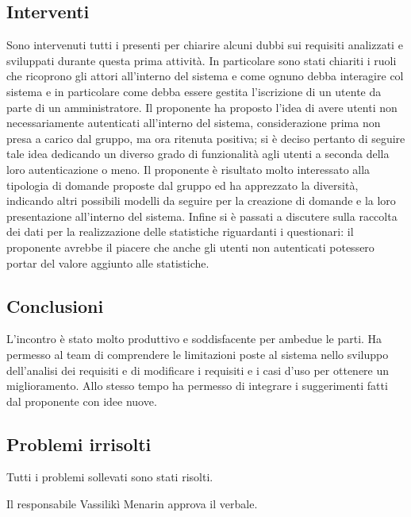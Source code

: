 \documentclass[a4paper]{article}
\def\RESPONSABILE{Vassilikì Menarin}
\begin{document}
\subsection*{Interventi}
Sono intervenuti tutti i presenti per chiarire alcuni dubbi sui requisiti analizzati e sviluppati durante questa prima attività.
\newline In particolare sono stati chiariti i ruoli che ricoprono gli attori all'interno del sistema e come ognuno debba interagire col sistema e in particolare come debba essere gestita l'iscrizione di un utente da parte di un amministratore.
\newline Il proponente ha proposto l'idea di avere utenti non necessariamente autenticati all'interno del sistema, considerazione prima non presa a carico dal gruppo, ma ora ritenuta positiva; si è deciso pertanto di seguire tale idea dedicando un diverso grado di funzionalità agli utenti a seconda della loro autenticazione o meno.
\newline Il proponente è risultato molto interessato alla tipologia di domande proposte dal gruppo ed ha apprezzato la diversità, indicando altri possibili modelli da seguire per la creazione di domande e la loro presentazione all'interno del sistema.
\newline Infine si è passati a discutere sulla raccolta dei dati per la realizzazione delle statistiche riguardanti i questionari: il proponente avrebbe il piacere che anche gli utenti non autenticati potessero portar del valore aggiunto alle statistiche.

\subsection*{Conclusioni}
L'incontro è stato molto produttivo e soddisfacente per ambedue le parti. Ha permesso al team di comprendere le limitazioni poste al sistema nello sviluppo dell'analisi dei requisiti e di modificare i requisiti e i casi d'uso per ottenere un miglioramento. Allo stesso tempo ha permesso di integrare i suggerimenti fatti dal proponente con idee nuove.

\subsection*{Problemi irrisolti}
Tutti i problemi sollevati sono stati risolti.

\vspace{2cm}
Il responsabile \RESPONSABILE{} approva il verbale.
\end{document}

